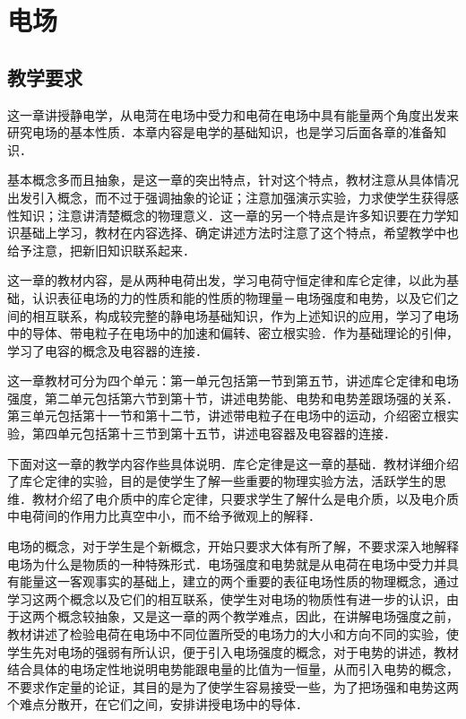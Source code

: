 \chapter{电场}\minitoc[n]
\section{教学要求}
这一章讲授静电学，从电菏在电场中受力和电荷在电场中具有能量两个角度出发来研究电场的基本性质．本章内容是电学的基础知识，也是学习后面各章的准备知识．

基本概念多而且抽象，是这一章的突出特点，针对这个特点，教材注意从具体情况出发引入概念，而不过于强调抽象的论证；注意加强演示实验，力求使学生获得感性知识；注意讲清楚概念的物理意义．这一章的另一个特点是许多知识要在力学知识基础上学习，教材在内容选择、确定讲述方法时注意了这个特点，希望教学中也给予注意，把新旧知识联系起来．

这一章的教材内容，是从两种电荷出发，学习电荷守恒定律和库仑定律，以此为基础，认识表征电场的力的性质和能的性质的物理量－电场强度和电势，以及它们之间的相互联系，构成较完整的静电场基础知识，作为上述知识的应用，学习了电场中的导体、带电粒子在电场中的加速和偏转、密立根实验．作为基础理论的引伸，学习了电容的概念及电容器的连接．

这一章教材可分为四个单元：第一单元包括第一节到第五节，讲述库仑定律和电场强度，第二单元包括第六节到第十节，讲述电势能、电势和电势差跟场强的关系．第三单元包括第十一节和第十二节，讲述带电粒子在电场中的运动，介绍密立根实验，第四单元包括第十三节到第十五节，讲述电容器及电容器的连接．

下面对这一章的教学内容作些具体说明．库仑定律是这一章的基础．教材详细介绍了库仑定律的实验，目的是使学生了解一些重要的物理实验方法，活跃学生的思维．教材介绍了电介质中的库仑定律，只要求学生了解什么是电介质，以及电介质中电荷间的作用力比真空中小，而不给予微观上的解释．

电场的概念，对于学生是个新概念，开始只要求大体有所了解，不要求深入地解释电场为什么是物质的一种特殊形式．电场强度和电势就是从电荷在电场中受力并具有能量这一客观事实的基础上，建立的两个重要的表征电场性质的物理概念，通过学习这两个概念以及它们的相互联系，使学生对电场的物质性有进一步的认识，由于这两个概念较抽象，又是这一章的两个教学难点，因此，在讲解电场强度之前，教材讲述了检验电荷在电场中不同位置所受的电场力的大小和方向不同的实验，使学生先对电场的强弱有所认识，便于引入电场强度的概念，对于电势的讲述，教材结合具体的电场定性地说明电势能跟电量的比值为一恒量，从而引入电势的概念，不要求作定量的论证，其目的是为了使学生容易接受一些，为了把场强和电势这两个难点分散开，在它们之间，安排讲授电场中的导体．

